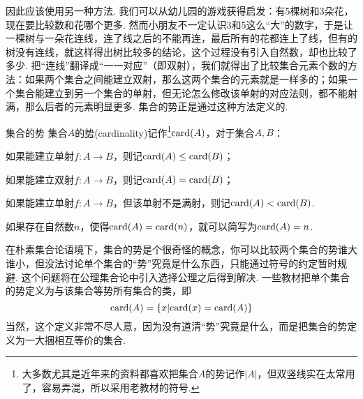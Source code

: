 \documentclass[main.tex]{subfiles}
\begin{document}
因此应该使用另一种方法. 我们可以从幼儿园的游戏获得启发：有5棵树和3朵花，现在要比较数和花哪个更多. 然而小朋友不一定认识3和5这么“大”的数字，于是让一棵树与一朵花连线，连了线之后的不能再连，最后所有的花都连上了线，但有的树没有连线，就这样得出树比较多的结论，这个过程没有引入自然数，却也比较了多少. 把“连线”翻译成“一一对应”（即双射），我们就得出了比较集合元素个数的方法：如果两个集合之间能建立双射，那么这两个集合的元素就是一样多的；如果一个集合能建立到另一个集合的单射，但无论怎么修改该单射的对应法则，都不能射满，那么后者的元素明显更多. 集合的势正是通过这种方法定义的.

\begin{definition}{集合的势}
    集合\(A\)的\uline{势}(cardinality)记作\footnote{大多数尤其是近年来的资料都喜欢把集合\(A\)的势记作\(|A|\)，但双竖线实在太常用了，容易弄混，所以采用老教材的符号.}\({\rm card}(A)\)，对于集合\(A,B\)：
    \par
    如果能建立单射\(f:A \to B\)，则记\({\rm card}(A) \leq {\rm card}(B)\)；
    \par
    如果能建立双射\(f:A \to B\)，则记\({\rm card}(A) = {\rm card}(B)\)；
    \par
    如果能建立单射\(f:A \to B\)，但该单射不是满射，则记\({\rm card}(A) <{\rm card}(B)\).
    \par
    如果存在自然数\(n\)，使得\({\rm card}(A) = {\rm card}(n)\)，就可以简写为\({\rm card}(A) = n\).
\end{definition}

在朴素集合论语境下，集合的势是个很奇怪的概念，你可以比较两个集合的势谁大谁小，但没法讨论单个集合的“势”究竟是什么东西，只能通过符号的约定暂时规避. 这个问题将在公理集合论中引入选择公理之后得到解决. 一些教材把单个集合的势定义为与该集合等势所有集合的类，即
\[{\rm card}(A) = \{x|{\rm card}(x)={\rm card}(A)\}\]
当然，这个定义非常不尽人意，因为没有道清“势”究竟是什么，而是把集合的势定义为一大捆相互等价的集合.
\end{document}
